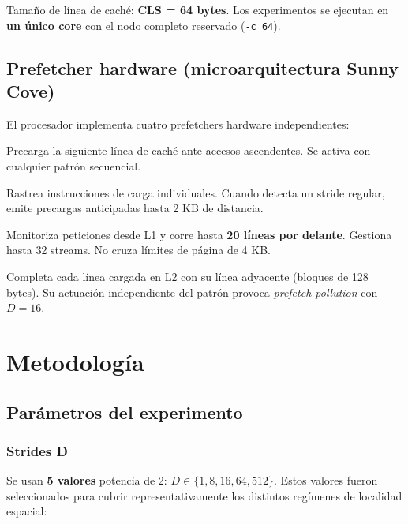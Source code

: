 \documentclass[12pt,a4paper]{article}
\begin{document}
Tamaño de línea de caché: \textbf{CLS = 64 bytes}.
Los experimentos se ejecutan en \textbf{un único core} con el nodo completo reservado (\texttt{-c 64}).

\subsection{Prefetcher hardware (microarquitectura Sunny Cove)}

El procesador implementa cuatro prefetchers hardware independientes:

\begin{description}[leftmargin=1.5em]
  \item[DCU Streamer:] Precarga la siguiente línea de caché ante accesos ascendentes.
  Se activa con cualquier patrón secuencial.
  \item[DCU IP Stride Prefetcher:] Rastrea instrucciones de carga individuales.
  Cuando detecta un stride regular, emite precargas anticipadas hasta 2 KB de distancia.
  \item[L2 Streamer:] Monitoriza peticiones desde L1 y corre hasta \textbf{20 líneas por delante}. Gestiona hasta 32 streams.
  No cruza límites de página de 4 KB.
  \item[L2 Spatial (Adjacent Cache Line):] Completa cada línea cargada en L2 con su línea adyacente (bloques de 128 bytes).
  Su actuación independiente del patrón provoca \emph{prefetch pollution} con $D=16$.
\end{description}

\section{Metodología}

\subsection{Parámetros del experimento}

\subsubsection*{Strides D}

Se usan \textbf{5 valores} potencia de 2: $D \in \{1, 8, 16, 64, 512\}$.
Estos valores fueron seleccionados para cubrir representativamente los distintos regímenes de localidad espacial:
\end{document}
